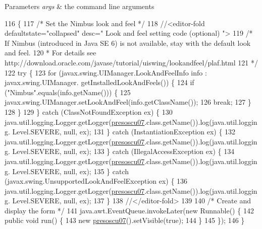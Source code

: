 \begin{DoxyParams}{Parameters}
{\em args} & the command line arguments \\
\hline
\end{DoxyParams}

\begin{DoxyCode}
116                                            \{
117         \textcolor{comment}{/* Set the Nimbus look and feel */}
118         \textcolor{comment}{//<editor-fold defaultstate="collapsed" desc=" Look and feel setting code (optional) ">}
119         \textcolor{comment}{/* If Nimbus (introduced in Java SE 6) is not available, stay with the default look and feel.}
120 \textcolor{comment}{         * For details see http://download.oracle.com/javase/tutorial/uiswing/lookandfeel/plaf.html }
121 \textcolor{comment}{         */}
122         \textcolor{keywordflow}{try} \{
123             \textcolor{keywordflow}{for} (javax.swing.UIManager.LookAndFeelInfo info : javax.swing.UIManager.
      getInstalledLookAndFeels()) \{
124                 \textcolor{keywordflow}{if} (\textcolor{stringliteral}{"Nimbus"}.equals(info.getName())) \{
125                     javax.swing.UIManager.setLookAndFeel(info.getClassName());
126                     \textcolor{keywordflow}{break};
127                 \}
128             \}
129         \} \textcolor{keywordflow}{catch} (ClassNotFoundException ex) \{
130             java.util.logging.Logger.getLogger(\mbox{\hyperlink{classinterfacessoguar_1_1presoscu07_ae655471017f46460a1310a594fec8065}{presoscu07}}.class.getName()).log(java.util.logging.
      Level.SEVERE, null, ex);
131         \} \textcolor{keywordflow}{catch} (InstantiationException ex) \{
132             java.util.logging.Logger.getLogger(\mbox{\hyperlink{classinterfacessoguar_1_1presoscu07_ae655471017f46460a1310a594fec8065}{presoscu07}}.class.getName()).log(java.util.logging.
      Level.SEVERE, null, ex);
133         \} \textcolor{keywordflow}{catch} (IllegalAccessException ex) \{
134             java.util.logging.Logger.getLogger(\mbox{\hyperlink{classinterfacessoguar_1_1presoscu07_ae655471017f46460a1310a594fec8065}{presoscu07}}.class.getName()).log(java.util.logging.
      Level.SEVERE, null, ex);
135         \} \textcolor{keywordflow}{catch} (javax.swing.UnsupportedLookAndFeelException ex) \{
136             java.util.logging.Logger.getLogger(\mbox{\hyperlink{classinterfacessoguar_1_1presoscu07_ae655471017f46460a1310a594fec8065}{presoscu07}}.class.getName()).log(java.util.logging.
      Level.SEVERE, null, ex);
137         \}
138         \textcolor{comment}{//</editor-fold>}
139 
140         \textcolor{comment}{/* Create and display the form */}
141         java.awt.EventQueue.invokeLater(\textcolor{keyword}{new} Runnable() \{
142             \textcolor{keyword}{public} \textcolor{keywordtype}{void} run() \{
143                 \textcolor{keyword}{new} \mbox{\hyperlink{classinterfacessoguar_1_1presoscu07_ae655471017f46460a1310a594fec8065}{presoscu07}}().setVisible(\textcolor{keyword}{true});
144             \}
145         \});
146     \}
\end{DoxyCode}


